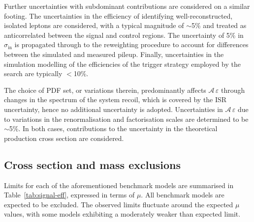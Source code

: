 Further uncertainties with subdominant contributions are considered on
a similar footing. The uncertainties in the efficiency of identifying
well-reconstructed, isolated leptons are considered, with a typical
magnitude of $\sim$5\% and treated as anticorrelated between the
signal and control regions. The uncertainty of 5\% in
$\sigma_\text{in}$ is propagated through to the reweighting procedure
to account for differences between the simulated and measured
pileup. Finally, uncertainties in the simulation modelling of the
efficiencies of the trigger strategy employed by the search are
typically $<$10\%.

The choice of PDF set, or variations therein, predominantly affects
$\mathcal{A}\,\varepsilon$ through changes in the \pt spectrum of
the system recoil, which is covered by the ISR uncertainty, hence no
additional uncertainty is adopted. Uncertainties in
$\mathcal{A}\,\varepsilon$ due to variations in the
renormalisation and factorisation scales are determined to be
$\sim$5\%. In both cases, contributions to the uncertainty in the
theoretical production cross section are considered.

\subsection{Cross section and mass exclusions}


Limits for each of the aforementioned benchmark models are summarised
in Table~\ref{tab:signal-eff}, expressed in terms of $\mu$. All
benchmark models are expected to be excluded. The observed limits
fluctuate around the expected $\mu$ values, with some models
exhibiting a moderately weaker than expected limit.

